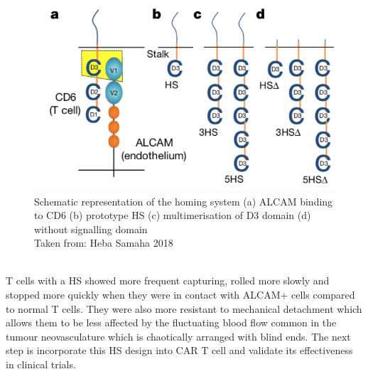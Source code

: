 \documentclass[12pt,oneside]{report}
\begin{document}
\begin{figure}[h!]
  \includegraphics[scale=0.8]{homing.png}
  \caption{Schematic representation of the homing system (a) ALCAM binding to CD6 (b) prototype HS (c) multimerisation of D3 domain (d) without signalling domain \\ Taken from: Heba Samaha 2018\citep{homing}}
\end{figure} \\
T cells with a HS showed more frequent capturing, rolled more slowly and stopped more quickly when they were in contact with ALCAM+ cells compared to normal T cells. They were also more resistant to mechanical detachment which allows them to be less affected by the fluctuating blood flow common in the tumour neovasculature which is chaotically arranged with blind ends. The next step is incorporate this HS design into CAR T cell and validate its effectiveness in clinical trials.
\end{document}
